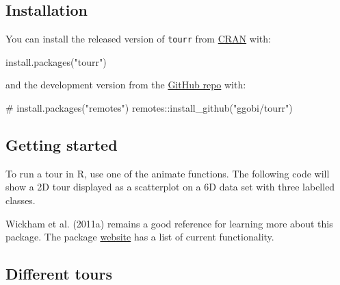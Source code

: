 \documentclass[
  letterpaper,
]{krantz}
\newenvironment{Shaded}{\begin{snugshade}}{\end{snugshade}}
\newcommand{\AttributeTok}[1]{\textcolor[rgb]{0.40,0.45,0.13}{#1}}
\newcommand{\CommentTok}[1]{\textcolor[rgb]{0.37,0.37,0.37}{#1}}
\newcommand{\DecValTok}[1]{\textcolor[rgb]{0.68,0.00,0.00}{#1}}
\newcommand{\FunctionTok}[1]{\textcolor[rgb]{0.28,0.35,0.67}{#1}}
\newcommand{\NormalTok}[1]{\textcolor[rgb]{0.00,0.23,0.31}{#1}}
\newcommand{\SpecialCharTok}[1]{\textcolor[rgb]{0.37,0.37,0.37}{#1}}
\newcommand{\StringTok}[1]{\textcolor[rgb]{0.13,0.47,0.30}{#1}}
\begin{document}
\subsection{Installation}\label{installation}

You can install the released version of \texttt{tourr} from
\href{https://CRAN.R-project.org}{CRAN} with:

\begin{Shaded}
\begin{Highlighting}[]
\FunctionTok{install.packages}\NormalTok{(}\StringTok{"tourr"}\NormalTok{)}
\end{Highlighting}
\end{Shaded}

and the development version from the
\href{https://github.com/ggobi/tourr}{GitHub repo} with:

\begin{Shaded}
\begin{Highlighting}[]
\CommentTok{\# install.packages("remotes")}
\NormalTok{remotes}\SpecialCharTok{::}\FunctionTok{install\_github}\NormalTok{(}\StringTok{"ggobi/tourr"}\NormalTok{)}
\end{Highlighting}
\end{Shaded}

\subsection{Getting started}\label{getting-started}

To run a tour in R, use one of the animate functions. The following code
will show a 2D tour displayed as a scatterplot on a 6D data set with
three labelled classes.

\begin{Shaded}
\end{Shaded}

Wickham et al. (2011a) remains a good reference for learning more about
this package. The package \href{http://ggobi.github.io/tourr/}{website}
has a list of current functionality.

\subsection{Different tours}\label{different-tours}
\end{document}
